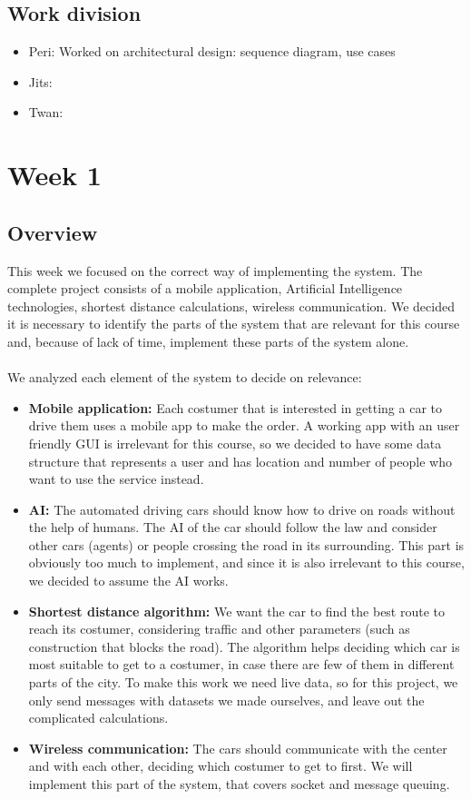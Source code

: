 \documentclass[a4paper]{article}
\begin{document}
\subsection*{Work division}
\begin{itemize}
    \item Peri: Worked on architectural design: sequence diagram, use cases
    \item Jits:
    \item Twan: 
\end{itemize}

\section*{Week 1}
\subsection*{Overview}
This week we focused on the correct way of implementing the system. The complete project consists of a mobile application, Artificial Intelligence technologies, shortest distance calculations, wireless communication. We decided it is necessary to identify the parts of the system that are relevant for this course and, because of lack of time, implement these parts of the system alone.
\\\\We analyzed each element of the system to decide on relevance:
\begin{itemize}
    \item \textbf{Mobile application:} Each costumer that is interested in getting a car to drive them uses a mobile app to make the order. A working app with an user friendly GUI is irrelevant for this course, so we decided to have some data structure that represents a user and has location and number of people who want to use the service instead.
    \item \textbf{AI:} The automated driving cars should know how to drive on roads without the help of humans. The AI of the car should follow the law and consider other cars (agents) or people crossing the road in its surrounding. This part is obviously too much to implement, and since it is also irrelevant to this course, we decided to assume the AI works.
    \item \textbf{Shortest distance algorithm:} We want the car to find the best route to reach its costumer, considering traffic and other parameters (such as construction that blocks the road). The algorithm helps deciding which car is most suitable to get to a costumer, in case there are few of them in different parts of the city. To make this work we need live data, so for this project, we only send messages with datasets we made ourselves, and leave out the complicated calculations.
    \item \textbf{Wireless communication:} The cars should communicate with the center and with each other, deciding which costumer to get to first. We will implement this part of the system, that covers socket and message queuing.
\end{itemize}
\end{document}

